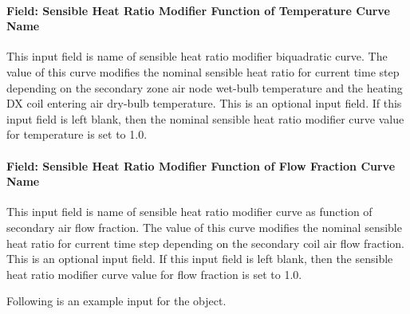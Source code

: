 \paragraph{Field: Sensible Heat Ratio Modifier Function of Temperature Curve Name}\label{field-sensible-heat-ratio-modifier-function-of-temperature-curve-name}

This input field is name of sensible heat ratio modifier biquadratic curve. The value of this curve modifies the nominal sensible heat ratio for current time step depending on the secondary zone air node wet-bulb temperature and the heating DX coil entering air dry-bulb temperature. This is an optional input field. If this input field is left blank, then the nominal sensible heat ratio modifier curve value for temperature is set to 1.0.

\paragraph{Field: Sensible Heat Ratio Modifier Function of Flow Fraction Curve Name}\label{field-sensible-heat-ratio-modifier-function-of-flow-fraction-curve-name}

This input field is name of sensible heat ratio modifier curve as function of secondary air flow fraction. The value of this curve modifies the nominal sensible heat ratio for current time step depending on the secondary coil air flow fraction. This is an optional input field. If this input field is left blank, then the sensible heat ratio modifier curve value for flow fraction is set to 1.0.

Following is an example input for the object.

